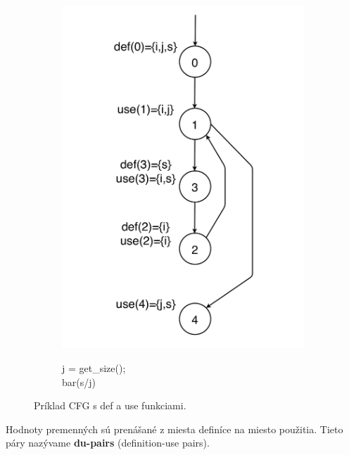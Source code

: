 \begin{figure}[H]
	\begin{subfigure}{0.5\linewidth}
		\centering
		\includegraphics[width=0.8\linewidth]{obrazky/cfg_def_use.pdf}
	\end{subfigure}
	\quad
	\begin{subfigure}{0.5\linewidth}
		\centering
		\begin{algorithm}[H]
			\DontPrintSemicolon
			\LinesNotNumbered
			 j = get\_size(); \\
			bar(s/j)
		\end{algorithm}
	\end{subfigure}
	\caption{Príklad CFG s def a use funkciami.}
\end{figure}

Hodnoty premenných sú prenášané z miesta definíce na miesto použitia.
Tieto páry nazývame \textbf{du-pairs} (definition-use pairs).

